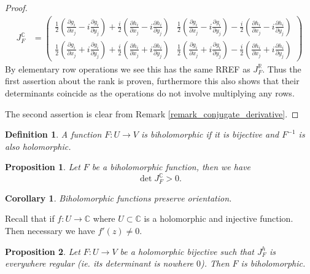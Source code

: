 \documentclass{article}
\newtheorem{proposition}{Proposition}[section]
\newtheorem{definition}{Definition}[section]
\newtheorem{corollary}{Corollary} [section]
\newcommand{\R}[0]{\mathbb{R}}
\newcommand{\C}[0]{\mathbb{C}}
\newcommand{\pd}[2]{{\frac {\partial#1} {\partial#2}}}
\begin{document}
\begin{proof}
\begin{align*}
  J_F^\C & = \begin{pmatrix}
    {\frac 1 2}\left(\pd{g_i}{x_j}-i\pd{g_i}{y_j}\right)+{\frac i 2}\left(\pd{h_i}{x_j}-i\pd{h_i}{y_j}\right) & {\frac 1 2}\left(\pd{g_i}{x_j}-i\pd{g_i}{y_j}\right)-{\frac i 2}\left(\pd{h_i}{x_j}-i\pd{h_i}{y_j}\right)\\
    {\frac 1 2}\left(\pd{g_i}{x_j}+i\pd{g_i}{y_j}\right)+{\frac i 2}\left(\pd{h_i}{x_j}+i\pd{h_i}{y_j}\right) & {\frac 1 2}\left(\pd{g_i}{x_j}+i\pd{g_i}{y_j}\right)-{\frac i 2}\left(\pd{h_i}{x_j}+i\pd{h_i}{y_j}\right)
  \end{pmatrix}
\end{align*}
By elementary row operations we see this has the same RREF as $J_F^\R$. Thus the first assertion about the rank is proven, furthermore this also shows that their determinants coincide as the operations do not involve multiplying any rows.
\par The second assertion is clear from Remark \ref{remark_conjugate_derivative}.
\end{proof}

\begin{definition}
A function $F:U\to V$ is biholomorphic if it is bijective and $F^{-1}$ is also holomorphic.
\end{definition}

\begin{proposition}
Let $F$ be a biholomorphic function, then we have
\begin{equation*}
\det J_F^\C >0.
\end{equation*}
\end{proposition}

\begin{corollary}
Biholomorphic functions preserve orientation.
\end{corollary}

Recall that if $f:U\to\C$ where $U\subset\C$ is a holomorphic and injective function. Then necessary we have $f'(z)\not=0$.

\begin{proposition}
Let $F:U\to V$ be a holomorphic bijective such that $J_F^h$ is everywhere regular (ie. its determinant is nowhere $0$). Then $F$ is biholomorphic.  
\end{proposition}
\end{document}
